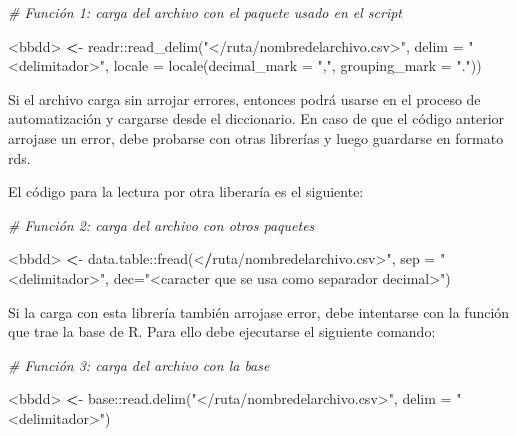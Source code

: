 \documentclass[
  spanish,
]{book}
\newenvironment{Shaded}{\begin{snugshade}}{\end{snugshade}}
\newcommand{\AttributeTok}[1]{\textcolor[rgb]{0.77,0.63,0.00}{#1}}
\newcommand{\CommentTok}[1]{\textcolor[rgb]{0.56,0.35,0.01}{\textit{#1}}}
\newcommand{\ErrorTok}[1]{\textcolor[rgb]{0.64,0.00,0.00}{\textbf{#1}}}
\newcommand{\FunctionTok}[1]{\textcolor[rgb]{0.00,0.00,0.00}{#1}}
\newcommand{\NormalTok}[1]{#1}
\newcommand{\SpecialCharTok}[1]{\textcolor[rgb]{0.00,0.00,0.00}{#1}}
\newcommand{\StringTok}[1]{\textcolor[rgb]{0.31,0.60,0.02}{#1}}
\begin{document}
\begin{Shaded}
\begin{Highlighting}[]
\CommentTok{\# Función 1: carga del archivo con el paquete usado en el script }

\SpecialCharTok{\textless{}}\NormalTok{bbdd}\SpecialCharTok{\textgreater{}} \ErrorTok{\textless{}}\SpecialCharTok{{-}}\NormalTok{ readr}\SpecialCharTok{::}\FunctionTok{read\_delim}\NormalTok{(}\StringTok{"\textless{}/ruta/nombredelarchivo.csv\textgreater{}"}\NormalTok{, }\AttributeTok{delim =} \StringTok{"\textless{}delimitador\textgreater{}"}\NormalTok{, }\AttributeTok{locale =} \FunctionTok{locale}\NormalTok{(}\AttributeTok{decimal\_mark =} \StringTok{","}\NormalTok{, }\AttributeTok{grouping\_mark =} \StringTok{"."}\NormalTok{))}
\end{Highlighting}
\end{Shaded}

Si el archivo carga sin arrojar errores, entonces podrá usarse en el proceso de automatización y cargarse desde el diccionario. En caso de que el código anterior arrojase un error, debe probarse con otras librerías y luego guardarse en formato rds.

El código para la lectura por otra liberaría es el siguiente:

\begin{Shaded}
\begin{Highlighting}[]
\CommentTok{\# Función 2: carga del archivo con otros paquetes}

\SpecialCharTok{\textless{}}\NormalTok{bbdd}\SpecialCharTok{\textgreater{}} \ErrorTok{\textless{}}\SpecialCharTok{{-}}\NormalTok{ data.table}\SpecialCharTok{::}\FunctionTok{fread}\NormalTok{(}\SpecialCharTok{\textless{}}\ErrorTok{/}\NormalTok{ruta}\SpecialCharTok{/}\NormalTok{nombredelarchivo.csv}\SpecialCharTok{\textgreater{}}\StringTok{", sep = "}\SpecialCharTok{\textless{}}\NormalTok{delimitador}\SpecialCharTok{\textgreater{}}\StringTok{", dec="}\SpecialCharTok{\textless{}}\NormalTok{caracter que se usa como separador decimal}\SpecialCharTok{\textgreater{}}\StringTok{")}
\end{Highlighting}
\end{Shaded}

Si la carga con esta librería también arrojase error, debe intentarse con la función que trae la base de R. Para ello debe ejecutarse el siguiente comando:

\begin{Shaded}
\begin{Highlighting}[]
\CommentTok{\# Función 3: carga del archivo con la base}

\SpecialCharTok{\textless{}}\NormalTok{bbdd}\SpecialCharTok{\textgreater{}} \ErrorTok{\textless{}}\SpecialCharTok{{-}}\NormalTok{ base}\SpecialCharTok{::}\FunctionTok{read.delim}\NormalTok{(}\StringTok{"\textless{}/ruta/nombredelarchivo.csv\textgreater{}"}\NormalTok{, }\AttributeTok{delim =} \StringTok{"\textless{}delimitador\textgreater{}"}\NormalTok{)}
\end{Highlighting}
\end{Shaded}
\end{document}
